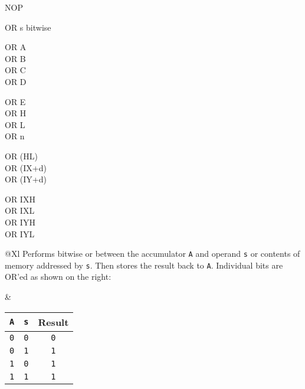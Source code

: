 \begin{basedescript}{
	\desclabelstyle{\multilinelabel}
	\desclabelwidth{3cm}}
\begin{DetailItem}{NOP}
	\end{DetailItem}

	\begin{DetailItem}{OR s}
		{bitwise }
		{}

		\begin{DetailVariants}[4]
			OR A\\
			OR B\\
			OR C\\
			OR D

			\columnbreak
			OR E\\
			OR H\\
			OR L\\
			OR n

			\columnbreak
			OR (HL)\\
			OR (IX+d)\\
			OR (IY+d)

			\columnbreak
			OR IXH\UNDOC\\
			OR IXL\UNDOC\\
			OR IYH\UNDOC\\
			OR IYL\UNDOC
		\end{DetailVariants}

		\begin{tabularx}{\linewidth}{@{}Xl}
			Performs bitwise or between the accumulator {\tt A} and operand {\tt s} or contents of memory addressed by {\tt s}. Then stores the result back to {\tt A}. Individual bits are OR'ed as shown on the right:
	
			&

			\begin{tabular}[t]{cc|c}
				{\tt A} & {\tt s} & Result \\
				\hline
				{\tt 0} & {\tt 0} & {\tt 0} \\
				{\tt 0} & {\tt 1} & {\tt 1} \\
				{\tt 1} & {\tt 0} & {\tt 1} \\
				{\tt 1} & {\tt 1} & {\tt 1} \\
			\end{tabular}

			\\
		\end{tabularx}

		\begin{DetailEffects}[p]
			\FlagsORr
		\end{DetailEffects}
				
		\begin{DetailTiming}
		\end{DetailTiming}


\end{DetailItem}
\end{basedescript}
